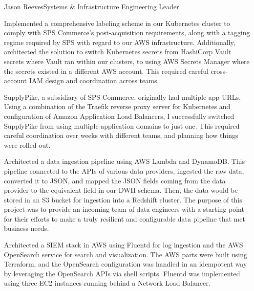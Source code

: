 \documentclass{article}
\begin{document}
\begin{cv}{Jason Reeves}{Systems \& Infrastructure Engineering Leader}
\begin{cvevent}[2025]
    Implemented a comprehensive labeling scheme in our Kubernetes cluster to comply with SPS Commerce's post-acquisition requirements, along with a tagging regime required by SPS with regard to our AWS infrastructure.  Additionally, architected the solution to switch Kubernetes secrets from HashiCorp Vault secrets where Vault ran within our clusters, to using AWS Secrets Manager where the secrets existed in a different AWS account.  This required careful cross-account IAM design and coordination across teams.
    \vspace*{5mm}
\end{cvevent}

\begin{cvevent}[2025]
    SupplyPike, a subsidiary of SPS Commerce, originally had multiple app URLs.  Using a combination of the Traefik reverse proxy server for Kubernetes and configuration of Amazon Application Load Balancers, I successfully switched SupplyPike from using multiple application domains to just one.  This required careful coordination over weeks with different teams, and planning how things were rolled out.
    \vspace*{5mm}
\end{cvevent}

\begin{cvevent}[2023-2024]
    Architected a data ingestion pipeline using AWS Lambda and DynamoDB.  This pipeline connected to the APIs of various data providers, ingested the raw data, converted it to JSON, and mapped the JSON fields coming from the data provider to the equivalent field in our DWH schema.  Then, the data would be stored in an S3 bucket for ingestion into a Redshift cluster.  The purpose of this project was to provide an incoming team of data engineers with a starting point for their efforts to make a truly resilient and configurable data pipeline that met business needs.
    \vspace*{5mm}
\end{cvevent}

\begin{cvevent}[2022-2023]
    Architected a SIEM stack in AWS using Fluentd for log ingestion and the AWS OpenSearch service for search and visualization.  The AWS parts were built using Terraform, and the OpenSearch configuration was handled in an idempotent way by leveraging the OpenSearch APIs via shell scripts.  Fluentd was implemented using three EC2 instances running behind a Network Load Balancer.  
    \vspace*{5mm}
\end{cvevent}


\end{cv}
\end{document}
